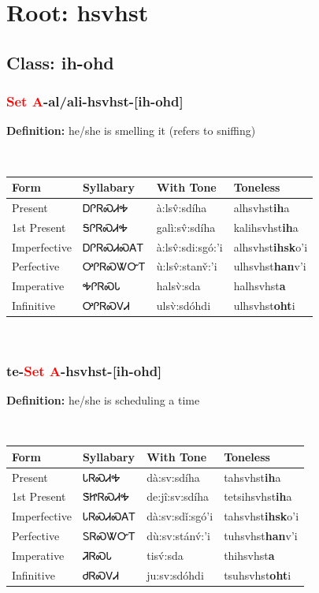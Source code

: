 \needspace{4in}
\section*{Root: hsvhst}
\nopagebreak
{}
\needspace{3in}
\subsection*{Class: ih-ohd}
\nopagebreak
\needspace{2in}
\subsubsection*{\textcolor{Red}{Set A}{-}al/ali{-}\textbf{hsvhst}{-}[ih-ohd]}
\nopagebreak
\textbf{Definition: } he/she is smelling it (refers to sniffing)
\\[0.5em]
\begin{tabularx}{\textwidth}{l X X X}%
\toprule%
\textbf{Form}&\textbf{Syllabary}&\textbf{With Tone}&\textbf{Toneless}\\%
\midrule%
Present&ᎠᎵᏒᏍᏗᎭ&à:lsv̂:sdíha&alhsvhst\textbf{ih}a\\%
1st Present&ᎦᎵᏒᏍᏗᎭ&galì:sv̂:sdíha&kalihsvhst\textbf{ih}a\\%
Imperfective&ᎠᎵᏒᏍᏗᏍᎪᎢ&à:lsv̂:sdi:sgó:’i&alhsvhst\textbf{ihsk}o'i\\%
Perfective&ᎤᎵᏒᏍᏔᏅᎢ&ù:lsv̂:stanv̌:’i&ulhsvhst\textbf{han}v'i\\%
Imperative&ᎭᎵᏒᏍᏓ&halsv̀:sda&halhsvhst\textbf{a}\\%
Infinitive&ᎤᎵᏒᏍᏙᏗ&ulsv̀:sdóhdi&ulhsvhst\textbf{oht}i\\%
\bottomrule%
\end{tabularx}
\\[1em]
\needspace{2in}
\subsubsection*{te{-}\textcolor{Red}{Set A}{-}\textbf{hsvhst}{-}[ih-ohd]}
\nopagebreak
\textbf{Definition: } he/she is scheduling a time
\\[0.5em]
\begin{tabularx}{\textwidth}{l X X X}%
\toprule%
\textbf{Form}&\textbf{Syllabary}&\textbf{With Tone}&\textbf{Toneless}\\%
\midrule%
Present&ᏓᏒᏍᏗᎭ&dà:sv:sdíha&tahsvhst\textbf{ih}a\\%
1st Present&ᏕᏥᏒᏍᏗᎭ&de:jî:sv:sdíha&tetsihsvhst\textbf{ih}a\\%
Imperfective&ᏓᏒᏍᏗᏍᎪᎢ&dà:sv:sdǐ:sgó’i&tahsvhst\textbf{ihsk}o'i\\%
Perfective&ᏚᏒᏍᏔᏅᎢ&dù:sv:stánv́:’i&tuhsvhst\textbf{han}v'i\\%
Imperative&ᏘᏒᏍᏓ&tisv́:sda&thihsvhst\textbf{a}\\%
Infinitive&ᏧᏒᏍᏙᏗ&ju:sv:sdóhdi&tsuhsvhst\textbf{oht}i\\%
\bottomrule%
\end{tabularx}
\\[1em]
